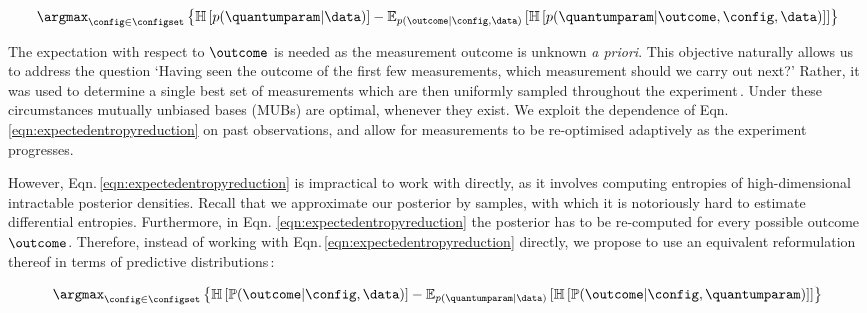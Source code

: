 \begin{equation}
\argmax_{\config\in\configset} \left\{ \mathbb{H}\left[p(\quantumparam|\data)\right] - \mathbb{E}_{p(\outcome\vert\config,\data)}\left[\mathbb{H}\left[ p(\quantumparam|\outcome,\config,\data) \right] \right]\right\}\label{eqn:expectedentropyreduction}
\end{equation} 


The expectation with respect to $\outcome$ is needed as the measurement outcome is unknown \emph{a priori}. This objective naturally allows us to address the question `Having seen the outcome of the first few measurements, which measurement should we carry out next?'
Rather, it was used to determine a single best set of measurements which are then uniformly sampled throughout the experiment\,\cite{MUBFirst,ExactInformation}. Under these circumstances mutually unbiased bases (MUBs) are optimal, whenever they exist. We exploit the dependence of Eqn.\,\eqref{eqn:expectedentropyreduction} on past observations, and allow for measurements to be re-optimised adaptively as the experiment progresses.

However, Eqn.\,\eqref{eqn:expectedentropyreduction}  is impractical to work with directly, as it involves computing entropies of high-dimensional intractable posterior densities. Recall that we approximate our posterior by samples, with which it is notoriously hard to estimate differential entropies. Furthermore, in Eqn. \eqref{eqn:expectedentropyreduction} the posterior has to be re-computed for every possible outcome $\outcome$. Therefore, instead of working with Eqn.\,\eqref{eqn:expectedentropyreduction} directly, we propose to use an equivalent reformulation thereof in terms of predictive distributions\,\cite{ExactInformation}:

\begin{equation}
\argmax_{\config\in\configset} \left\{ \mathbb{H}\left[\mathbb{P}(\outcome|\config,\data)\right] - \mathbb{E}_{p(\quantumparam\vert\data)}\left[\mathbb{H}\left[ \mathbb{P}(\outcome|\config,\quantumparam) \right] \right]\right\}\label{eqn:rearrangement}
\end{equation}

